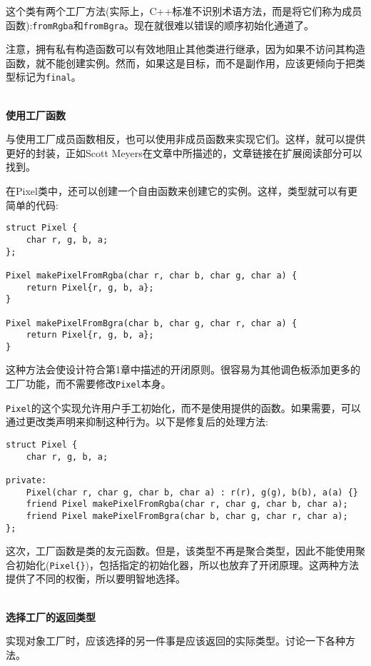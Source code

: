 这个类有两个工厂方法(实际上，C++标准不识别术语方法，而是将它们称为成员函数):\texttt{fromRgba}和\texttt{fromBgra}。现在就很难以错误的顺序初始化通道了。

注意，拥有私有构造函数可以有效地阻止其他类进行继承，因为如果不访问其构造函数，就不能创建实例。然而，如果这是目标，而不是副作用，应该更倾向于把类型标记为\texttt{final}。

\hspace*{\fill} \\ %
\noindent
\textbf{使用工厂函数}

与使用工厂成员函数相反，也可以使用非成员函数来实现它们。这样，就可以提供更好的封装，正如Scott Meyers在文章中所描述的，文章链接在扩展阅读部分可以找到。

在Pixel类中，还可以创建一个自由函数来创建它的实例。这样，类型就可以有更简单的代码:

\begin{lstlisting}[style=styleCXX]
struct Pixel {
	char r, g, b, a;
};

Pixel makePixelFromRgba(char r, char b, char g, char a) {
	return Pixel{r, g, b, a};
}

Pixel makePixelFromBgra(char b, char g, char r, char a) {
	return Pixel{r, g, b, a};
}
\end{lstlisting}

这种方法会使设计符合第1章中描述的开闭原则。很容易为其他调色板添加更多的工厂功能，而不需要修改\texttt{Pixel}本身。

\texttt{Pixel}的这个实现允许用户手工初始化，而不是使用提供的函数。如果需要，可以通过更改类声明来抑制这种行为。以下是修复后的处理方法:

\begin{lstlisting}[style=styleCXX]
struct Pixel {
	char r, g, b, a;
	
private:
	Pixel(char r, char g, char b, char a) : r(r), g(g), b(b), a(a) {}
	friend Pixel makePixelFromRgba(char r, char g, char b, char a);
	friend Pixel makePixelFromBgra(char b, char g, char r, char a);
};
\end{lstlisting}

这次，工厂函数是类的友元函数。但是，该类型不再是聚合类型，因此不能使用聚合初始化(\texttt{Pixel\{\}})，包括指定的初始化器，所以也放弃了开闭原理。这两种方法提供了不同的权衡，所以要明智地选择。

\hspace*{\fill} \\ %
\noindent
\textbf{选择工厂的返回类型}

实现对象工厂时，应该选择的另一件事是应该返回的实际类型。讨论一下各种方法。

